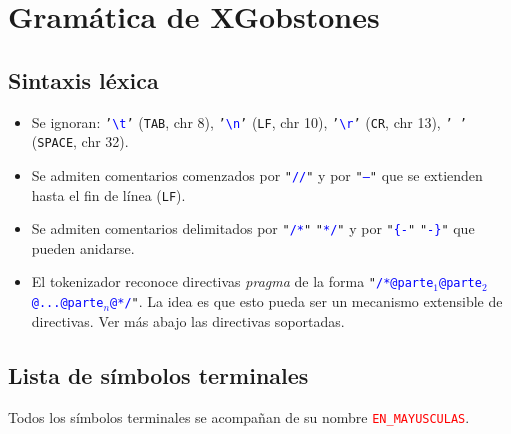 \documentclass{article}
\begin{document}
\newcommand{\chr}[1]{\texttt{'}\textcolor{blue}{\texttt{#1}}\texttt{'}}
\newcommand{\str}[1]{\texttt{"}\textcolor{blue}{\texttt{#1}}\texttt{"}}
\newcommand{\tok}[1]{\textcolor{red}{\texttt{#1}}}
\newcommand{\symbolentry}[3]{#1 & #2 && #3 \\}
\newcommand{\nb}[1]{\footnotesize{#1}}
\newcommand{\s}[1]{\textcolor{blue}{{\it$\langle$#1$\rangle$}}}
\newcommand{\nonEmpty}[1]{#1$_{1}$}
\newcommand{\produccion}[2]{
  \noindent
  \begin{tabularx}{\textwidth}{lrlr}
  #1 & $\xrightarrow{\hspace{.5cm}}$ & #2
  \end{tabularx}\\
}
\newcommand{\EMPTY}{$\epsilon$}
\newcommand{\ALT}{
  \\ & $\mid$ &
}
\newcommand{\TODO}[1]{\textcolor{red}{****#1****}}
\section{Gram\'atica de XGobstones}

\subsection{Sintaxis l\'exica}

\begin{itemize}
\item Se ignoran:
\chr{\textbackslash t} (\texttt{TAB}, chr 8),
\chr{\textbackslash n} (\texttt{LF}, chr 10),
\chr{\textbackslash r} (\texttt{CR}, chr 13),
\chr{\,} (\texttt{SPACE}, chr 32).
\item Se admiten comentarios comenzados por \str{//} y por \str{--} que se extienden hasta el fin de l\'inea (\texttt{LF}).
\item Se admiten comentarios delimitados por \str{/*} \str{*/} y por \str{\{-} \str{-\}} que pueden anidarse.
\item El tokenizador reconoce directivas {\em pragma} de la forma \str{/*@parte$_1$@parte$_2$@...@parte$_n$@*/}. La idea es que esto pueda ser un mecanismo extensible de directivas. Ver m\'as abajo las directivas soportadas.
\end{itemize}


\subsection{Lista de s\'imbolos terminales}

Todos los s\'imbolos terminales se acompa\~nan de su nombre \tok{EN\_MAYUSCULAS}.\bigskip
\end{document}
